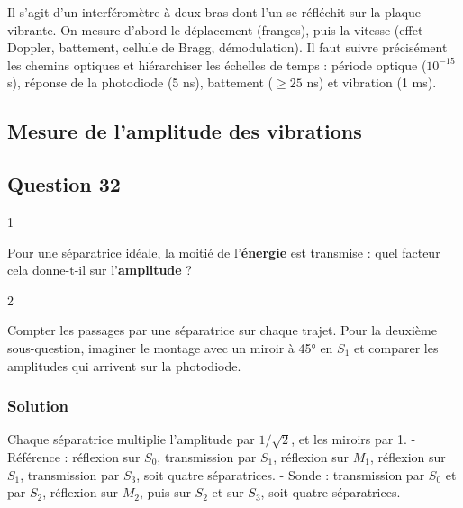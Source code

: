 \documentclass[11pt,a4paper]{article}
\newcommand{\equationajustee}[1]{%
  \sbox{\boiteequation}{$\displaystyle #1$}%
  \ifdim\wd\boiteequation>\linewidth
    \[\resizebox{\linewidth}{!}{\usebox{\boiteequation}}\]%
  \else
    \[#1\]%
  \fi}
\begin{document}
Il s'agit d'un interféromètre à deux bras dont l'un se réfléchit sur la plaque vibrante. On mesure d'abord le déplacement (franges), puis la vitesse (effet Doppler, battement, cellule de Bragg, démodulation). Il faut suivre précisément les chemins optiques et hiérarchiser les échelles de temps : période optique (\(10^{-15}\) s), réponse de la photodiode (5 ns), battement (\(\ge25\) ns) et vibration (1 ms).

\hypertarget{mesure-de-lamplitude-des-vibrations}{%
\subsection{Mesure de l'amplitude des vibrations}\label{mesure-de-lamplitude-des-vibrations}}

\hypertarget{question-32}{%
\subsection{Question 32}\label{question-32}}

\begin{indication}{1}

Pour une séparatrice idéale, la moitié de l'\textbf{énergie} est transmise : quel facteur cela donne-t-il sur l'\textbf{amplitude} ?

\end{indication}

\begin{indication}{2}

Compter les passages par une séparatrice sur chaque trajet. Pour la deuxième sous-question, imaginer le montage avec un miroir à 45° en \(S_1\) et comparer les amplitudes qui arrivent sur la photodiode.

\end{indication}

\hypertarget{solution-31}{%
\subsubsection{Solution}\label{solution-31}}

Chaque séparatrice multiplie l'amplitude par \(1/\sqrt2\), et les miroirs par 1.
- Référence : réflexion sur \(S_0\), transmission par \(S_1\), réflexion sur \(M_1\), réflexion sur \(S_1\), transmission par \(S_3\), soit quatre séparatrices.
- Sonde : transmission par \(S_0\) et par \(S_2\), réflexion sur \(M_2\), puis sur \(S_2\) et sur \(S_3\), soit quatre séparatrices.

\equationajustee{\boxed{a_1=a_2=\frac{a_0}{4}}}
\end{document}
